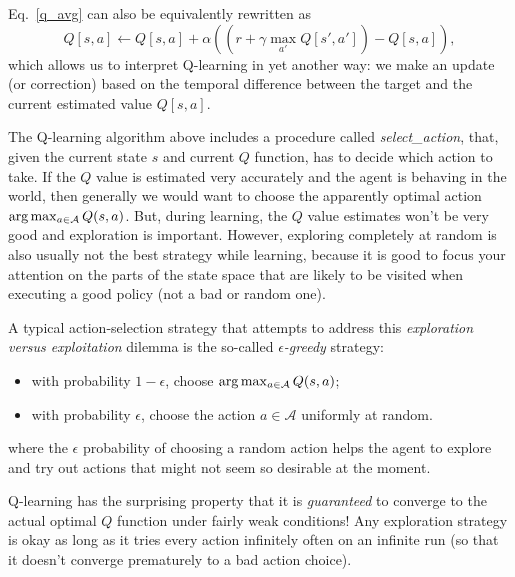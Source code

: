 Eq.~\ref{q_avg} can also be equivalently rewritten as
\begin{equation}\label{td:q}
  Q[s, a] \leftarrow Q[s, a]
  + \alpha\left((r + \gamma \max_{a'}
  Q[s',a'])-Q[s,a]\right),
\end{equation}
which allows us to interpret Q-learning in yet another way: we make an
update (or correction) based on the temporal difference between the
target and the current estimated value $Q[s, a].$





The Q-learning algorithm above includes a procedure called {\it select\_action},
that, given the current state $s$ and current $Q$ function, has to decide
which action to take.  If the $Q$ value is estimated very accurately
and the agent is behaving in the world, then generally we would want
to choose the apparently optimal action ${\rm arg}\max_{a \in \mathcal{A}}
  Q(s,a)$.  But, during learning, the $Q$ value estimates won't be very
good and exploration is important.  However, exploring completely at
random is also usually not the best strategy while learning, because
it is good to focus your attention on the parts of the state space
that are likely to be visited when executing a good policy (not a bad
or random one).

A typical action-selection strategy that attempts to address this
  {\em exploration versus exploitation} dilemma is the so-called {\em
$\epsilon$-greedy} strategy:
\begin{itemize}
  \item with probability $1-\epsilon$, choose
        ${\rm arg}\max_{a \in \mathcal{A}} Q(s,a)$;
  \item with probability $\epsilon$, choose the action $a \in \mathcal{A}$
        uniformly at random.
\end{itemize}
where the $\epsilon$ probability of choosing a random action helps the
agent to explore and try out actions that might not seem so desirable
at the moment.


Q-learning has the surprising property that it is {\em guaranteed} to
converge to the actual optimal $Q$ function under fairly weak
conditions!  Any exploration strategy is okay as long as it tries
every action infinitely often on an infinite run (so that it doesn't
converge prematurely to a bad action choice).

